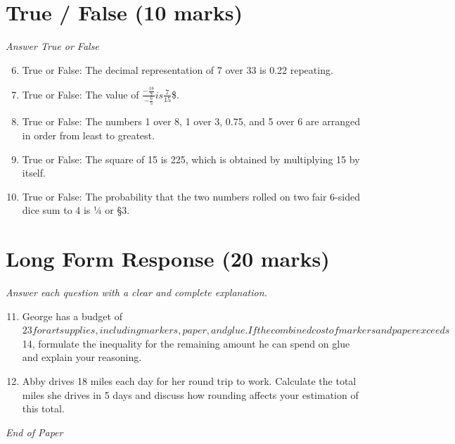 \documentclass[12pt]{article}
\begin{document}
\section*{True / False (10 marks)}
\textit{Answer True or False}
\begin{enumerate}[label=\arabic*.]
\setcounter{enumi}{5}
\item True or False: The decimal representation of 7 over 33 is 0.22 repeating.
\item True or False: The value of $\frac{-\frac{18}{7}}{-\frac{6}{5}}$$ is $$\frac{7}{15}$\$.
\item True or False: The numbers 1 over 8, 1 over 3, 0.75, and 5 over 6 are arranged in order from least to greatest.
\item True or False: The square of 15 is 225, which is obtained by multiplying 15 by itself.
\item True or False: The probability that the two numbers rolled on two fair 6-sided dice sum to 4 is ¼ or §3.
\end{enumerate}

\section*{Long Form Response (20 marks)}
\textit{Answer each question with a clear and complete explanation.}
\begin{enumerate}[label=\arabic*.]
\setcounter{enumi}{10}
\item George has a budget of $23 for art supplies, including markers, paper, and glue. If the combined cost of markers and paper exceeds $14, formulate the inequality for the remaining amount he can spend on glue and explain your reasoning.
\item Abby drives 18 miles each day for her round trip to work. Calculate the total miles she drives in 5 days and discuss how rounding affects your estimation of this total.
\end{enumerate}

\vfill
\noindent\textit{End of Paper}
\end{document}
